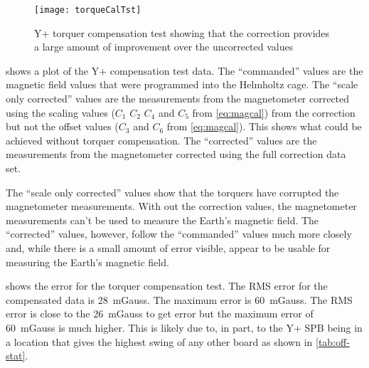 \begin{figure}[!ht]
    \centering
    \texttt{[image: torqueCalTst]}
    \caption{Y+ torquer compensation test showing that the correction provides a large amount of improvement over the uncorrected values}
    \label{fig:tqtst}
\end{figure}

 shows a plot of the Y+ compensation test data. The \enquote{commanded} values are the magnetic field values that were programmed into the Helmholtz cage. The \enquote{scale only corrected} values are the measurements from the magnetometer corrected using the scaling values ($C_1$ $C_2$ $C_4$ and $C_5$ from \cref{eq:magcal}) from the correction but not the offset values ($C_3$ and $C_6$ from \cref{eq:magcal}). This shows what could be achieved without torquer compensation. The \enquote{corrected} values are the measurements from the magnetometer corrected using the full correction data set.

The \enquote{scale only corrected} values show that the torquers have corrupted the magnetometer measurements. With out the correction values, the magnetometer measurements can't be used to measure the Earth's magnetic field. The \enquote{corrected} values, however, follow the \enquote{commanded} values much more closely and, while there is a small amount of error visible, appear to be usable for measuring the Earth's magnetic field.


 shows the error for the torquer compensation test. The RMS error for the compensated data is 28~mGauss. The maximum error is 60~mGauss. The RMS error is close to the 26~mGauss to get {\textdegree} error but the maximum error of 60~mGauss is much higher. This is likely due to, in part, to the Y+ \ac{SPB} being in a location that gives the highest swing of any other board as shown in \cref{tab:off-stat}.


